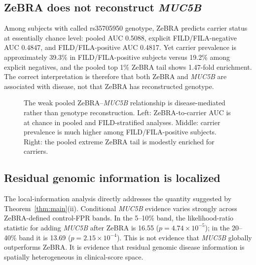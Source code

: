 \documentclass[journal]{IEEEtran}
\begin{document}
\subsection{ZeBRA does not reconstruct \textit{MUC5B}}
Among subjects with called rs35705950 genotype, ZeBRA predicts carrier status at essentially chance level: pooled AUC 0.5088, explicit FILD/FILA-negative AUC 0.4847, and FILD/FILA-positive AUC 0.4817. Yet carrier prevalence is approximately 39.3\% in FILD/FILA-positive subjects versus 19.2\% among explicit negatives, and the pooled top 1\% ZeBRA tail shows 1.47-fold enrichment. The correct interpretation is therefore that both ZeBRA and \textit{MUC5B} are associated with disease, not that ZeBRA has reconstructed genotype.

\begin{figure}[!t]\centering{}
\caption{The weak pooled ZeBRA--\textit{MUC5B} relationship is disease-mediated rather than genotype reconstruction. Left: ZeBRA-to-carrier AUC is at chance in pooled and FILD-stratified analyses. Middle: carrier prevalence is much higher among FILD/FILA-positive subjects. Right: the pooled extreme ZeBRA tail is modestly enriched for carriers.}
\label{fig:muc5b}
\end{figure}

\subsection{Residual genomic information is localized}
The local-information analysis directly addresses the quantity suggested by Theorem~\ref{thm:main}(ii). Conditional \textit{MUC5B} evidence varies strongly across ZeBRA-defined control-FPR bands. In the 5--10\% band, the likelihood-ratio statistic for adding \textit{MUC5B} after ZeBRA is 16.55 ($p=4.74\times10^{-5}$); in the 20--40\% band it is 13.69 ($p=2.15\times10^{-4}$). This is not evidence that \textit{MUC5B} globally outperforms ZeBRA. It is evidence that residual genomic disease information is spatially heterogeneous in clinical-score space.
\end{document}
